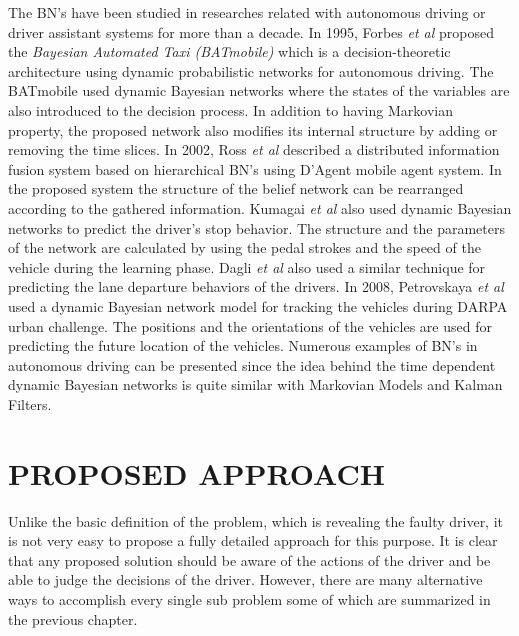 \documentclass[a4paper,oneside,12pt]{report}
\begin{document}
The BN's have been studied in researches related with autonomous driving or driver assistant systems for more than a decade. In 1995, Forbes \textit{et al} \cite{forbes_batmobile:_1995} proposed the \textit{Bayesian Automated Taxi (BATmobile)} which is a decision-theoretic architecture using dynamic probabilistic networks for autonomous driving. The BATmobile used dynamic Bayesian networks where the states of the variables are also introduced to the decision process. In addition to having Markovian property, the proposed network also modifies its internal structure by adding or removing the time slices. In 2002, Ross \textit{et al} \cite{ross_mobile_1998} described a distributed information fusion system based on hierarchical BN's using D'Agent mobile agent system. In the proposed system the structure of the belief network can be rearranged according to the gathered information. Kumagai \textit{et al} \cite{kumagai_prediction_2003} also used dynamic Bayesian networks to predict the driver's stop behavior. The structure and the parameters of the network are calculated by using the pedal strokes and the speed of the vehicle during the learning phase. Dagli \textit{et al} \cite{dagli_action_2010} also used a similar technique for predicting the lane departure behaviors of the drivers. In 2008, Petrovskaya \textit{et al} \cite{petrovskaya_model_2008} used a dynamic Bayesian network model for tracking the vehicles during DARPA urban challenge. The positions and the orientations of the vehicles are used for predicting the future location of the vehicles. Numerous examples of BN's in autonomous driving can be presented since the idea behind the time dependent dynamic Bayesian networks is quite similar with Markovian Models and Kalman Filters.

\chapter{PROPOSED APPROACH}
\label{proposedapproach}
Unlike the basic definition of the problem, which is revealing the faulty driver, it is not very easy to propose a fully detailed approach for this purpose. It is clear that any proposed solution should be aware of the actions of the driver and be able to judge the decisions of the driver. However, there are many alternative ways to accomplish every single sub problem some of which are summarized in the previous chapter.
\end{document}

